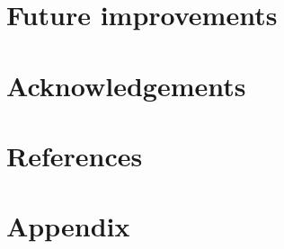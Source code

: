 \documentclass[11pt]{report}
\begin{document}
    \section{Future improvements}\label{sec:improvements}


    \section{Acknowledgements}\label{sec:acknowledgements}


    \section{References}\label{sec:references}

    \printbibliography
%    


    \section{Appendix}\label{sec:appendix}
\end{document}
